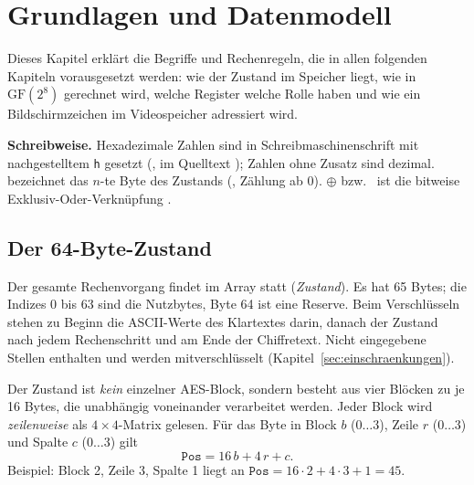 \section{Grundlagen und Datenmodell}\label{sec:grundlagen}
Dieses Kapitel erklärt die Begriffe und Rechenregeln, die in allen folgenden Kapiteln vorausgesetzt werden: wie der Zustand im Speicher liegt, wie in $\mathrm{GF}(2^8)$ gerechnet wird, welche Register welche Rolle haben und wie ein Bildschirmzeichen im Videospeicher adressiert wird.

\textbf{Schreibweise.} Hexadezimale Zahlen sind in Schreibmaschinenschrift mit nachgestelltem \texttt{h} gesetzt (, im Quelltext ); Zahlen ohne Zusatz sind dezimal.  bezeichnet das $n$-te Byte des Zustands (, Zählung ab 0). $\oplus$ bzw.\  ist die bitweise Exklusiv-Oder-Verknüpfung \cite{xor}.

\subsection{Der 64-Byte-Zustand}\label{sec:zustand}
Der gesamte Rechenvorgang findet im Array  statt (\emph{Zustand}). Es hat 65 Bytes; die Indizes 0 bis 63 sind die Nutzbytes, Byte 64 ist eine Reserve. Beim Verschlüsseln stehen zu Beginn die ASCII-Werte des Klartextes darin, danach der Zustand nach jedem Rechenschritt und am Ende der Chiffretext. Nicht eingegebene Stellen enthalten  und werden mitverschlüsselt (Kapitel~\ref{sec:einschraenkungen}).

Der Zustand ist \emph{kein} einzelner AES-Block, sondern besteht aus vier Blöcken zu je 16 Bytes, die unabhängig voneinander verarbeitet werden. Jeder Block wird \emph{zeilenweise} als $4\times4$-Matrix gelesen. Für das Byte in Block $b$ ($0\ldots3$), Zeile $r$ ($0\ldots3$) und Spalte $c$ ($0\ldots3$) gilt
\[
    \mathtt{Pos} = 16\,b + 4\,r + c .
\]
Beispiel: Block 2, Zeile 3, Spalte 1 liegt an $\mathtt{Pos}=16\cdot2+4\cdot3+1=45$.


